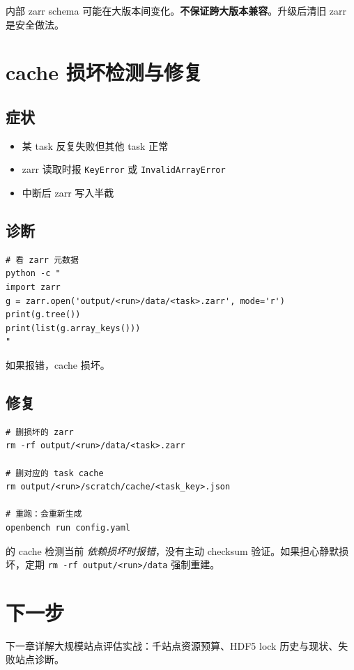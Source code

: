 \openbench{} 内部 zarr schema 可能在大版本间变化。\textbf{不保证跨大版本兼容}。升级后清旧 zarr 是安全做法。

\section{cache 损坏检测与修复}

\subsection{症状}

\begin{itemize}
  \item 某 task 反复失败但其他 task 正常
  \item zarr 读取时报 \texttt{KeyError} 或 \texttt{InvalidArrayError}
  \item 中断后 zarr 写入半截
\end{itemize}

\subsection{诊断}

\begin{verbatim}
# 看 zarr 元数据
python -c "
import zarr
g = zarr.open('output/<run>/data/<task>.zarr', mode='r')
print(g.tree())
print(list(g.array_keys()))
"
\end{verbatim}

如果报错，cache 损坏。

\subsection{修复}

\begin{verbatim}
# 删损坏的 zarr
rm -rf output/<run>/data/<task>.zarr

# 删对应的 task cache
rm output/<run>/scratch/cache/<task_key>.json

# 重跑：会重新生成
openbench run config.yaml
\end{verbatim}

\openbench{} 的 cache 检测当前 \emph{依赖损坏时报错}，没有主动 checksum 验证。如果担心静默损坏，定期 \texttt{rm -rf output/<run>/data} 强制重建。

\section{下一步}

下一章详解大规模站点评估实战：千站点资源预算、HDF5 lock 历史与现状、失败站点诊断。
